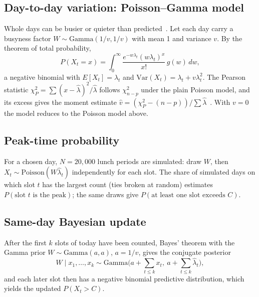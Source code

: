 \documentclass[conference,a4paper]{IEEEtran}
\begin{document}
\subsection{Day-to-day variation: Poisson--Gamma model}
Whole days can be busier or quieter than predicted~\cite{ibrahim2016}. Let each day carry a busyness factor
$W \sim \mathrm{Gamma}(1/v, 1/v)$ with mean 1 and variance $v$. By the theorem of total probability,
\begin{equation}
P(X_t = x) = \int_0^\infty \frac{e^{-w\lambda_t}(w\lambda_t)^x}{x!}\, g(w)\,dw ,
\end{equation}
a negative binomial with $E[X_t] = \lambda_t$ and $\mathrm{Var}(X_t) = \lambda_t + v\lambda_t^2$. The Pearson statistic
$\chi^2_P = \sum (x - \hat\lambda)^2/\hat\lambda$ follows $\chi^2_{n-p}$ under the plain Poisson model, and its excess
gives the moment estimate $\hat v = (\chi^2_P - (n-p))/\sum\hat\lambda$~\cite{cameron1990}. With $v = 0$ the model
reduces to the Poisson model above.

\subsection{Peak-time probability}
For a chosen day, $N = 20{,}000$ lunch periods are simulated: draw $W$, then $X_t \sim \mathrm{Poisson}(W\hat\lambda_t)$
independently for each slot. The share of simulated days on which slot $t$ has the largest count (ties broken at
random) estimates $P(\text{slot } t \text{ is the peak})$; the same draws give $P(\text{at least one slot exceeds } C)$.

\subsection{Same-day Bayesian update}
After the first $k$ slots of today have been counted, Bayes' theorem with the Gamma prior $W \sim \mathrm{Gamma}(a, a)$,
$a = 1/v$, gives the conjugate posterior
\begin{equation}
W \mid x_1,\dots,x_k \sim \mathrm{Gamma}\Big(a + \sum_{t\le k} x_t,\ a + \sum_{t\le k}\hat\lambda_t\Big),
\end{equation}
and each later slot then has a negative binomial predictive distribution, which yields the updated $P(X_t > C)$.
\end{document}
